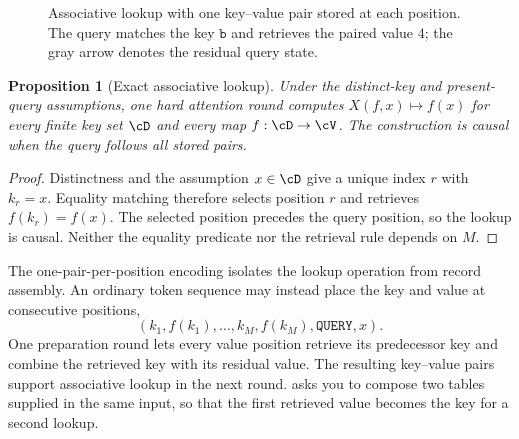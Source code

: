\documentclass[11pt,twoside]{article}
\newtheorem{proposition}[theorem]{Proposition}
\theoremstyle{definition}
\theoremstyle{remark}
\begin{document}
\begin{figure}[ht]
\centering
{}
\caption{Associative lookup with one key--value pair stored at each position.
The query matches the key $\mathtt b$ and retrieves the paired value $4$; the
gray arrow denotes the residual query state.}
\label{fig:associative-lookup}
\end{figure}

\begin{proposition}[Exact associative lookup]
\label{prop:associative-lookup}
Under the distinct-key and present-query assumptions, one hard attention
round computes $X(f,x)\mapsto f(x)$ for every finite key set $\cD$ and every
map $f:\cD\to\cV$. The construction is causal when the query follows all
stored pairs.
\end{proposition}

\begin{proof}
Distinctness and the assumption $x\in\cD$ give a unique index $r$ with
$k_r=x$. Equality matching therefore selects position $r$ and retrieves
$f(k_r)=f(x)$. The selected position precedes the query position, so the
lookup is causal. Neither the equality predicate nor the retrieval rule
depends on $M$.
\end{proof}

The one-pair-per-position encoding isolates the lookup operation from record
assembly. An ordinary token sequence may instead place the key and value at
consecutive positions,
\[
 (k_1,f(k_1),\ldots,k_M,f(k_M),\mathtt{QUERY},x).
\]
One preparation round lets every value position retrieve its predecessor key
and combine the retrieved key with its residual value. The resulting
key--value pairs support associative lookup in the next round.
 asks you to compose two tables supplied
in the same input, so that the first retrieved value becomes the key for a
second lookup.
\end{document}
